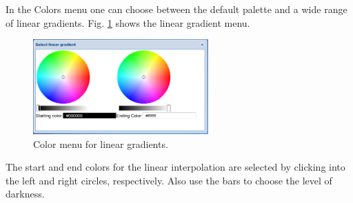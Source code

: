 \documentclass{article}
\begin{document}
In the Colors menu one can choose between the default palette and a wide
range of linear gradients. Fig. \ref{fig:lingrad} shows the linear gradient 
menu.
\newpage
\begin{figure}[!ht]
\begin{center}
\includegraphics[width=0.6\textwidth]{img/lingrad.png}
\end{center}
\caption{Color menu for linear gradients.}
\label{fig:lingrad}
\end{figure}

\noindent
The start and end colors for the linear interpolation are selected
by clicking into the left and right circles, respectively. Also 
use the bars to choose the level of darkness. 
\end{document}
